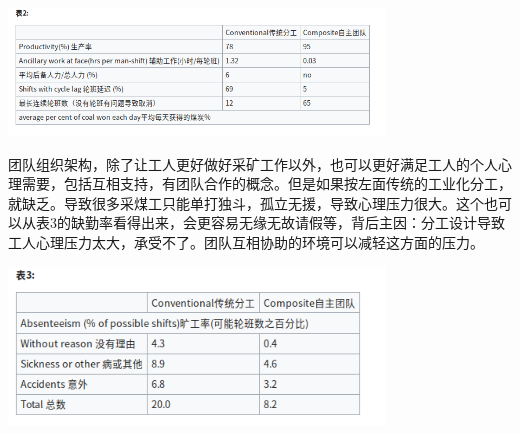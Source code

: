 

\includegraphics[width=10cm]{Screenshotfrom2022-12-2806-57-58.png}

团队组织架构，除了让工人更好做好采矿工作以外，也可以更好满足工人的个人心理需要，包括互相支持，有团队合作的概念。但是如果按左面传统的工业化分工，就缺乏。导致很多采煤工只能单打独斗，孤立无援，导致心理压力很大。这个也可以从表3的缺勤率看得出来，会更容易无缘无故请假等，背后主因：分工设计导致工人心理压力太大，承受不了。团队互相协助的环境可以减轻这方面的压力。



\includegraphics[width=10cm]{Screenshotfrom2022-12-2806-58-22.png}




